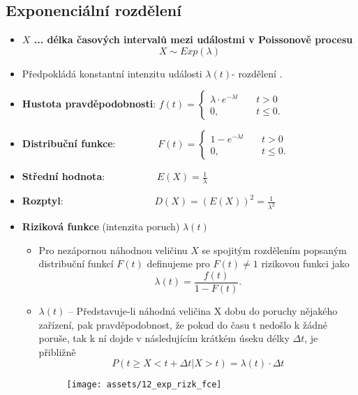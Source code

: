 \subsection{Exponenciální rozdělení}
\begin{itemize}
    \item \textbf{$X$ ... délka časových intervalů mezi událostmi v Poissonově procesu}
          $$X \sim Exp(\lambda)$$
    \item Předpokládá konstantní intenzitu události $\lambda(t)$- rozdělení .
    \item \textbf{Hustota pravděpodobnosti}:
          $f(t) =	\begin{cases}
                  \lambda \cdot e^{-\lambda t} & \quad t > 0     \\
                  0,                           & \quad t \leq 0.
              \end{cases}$
    \item \textbf{Distribuční funkce}:
          $\qquad\qquad F(t) =	\begin{cases}
                  1 -  e^{-\lambda t} & \quad t > 0     \\
                  0,                  & \quad t \leq 0.
              \end{cases}$
    \item \textbf{Střední hodnota}: $\qquad\qquad\quad E(X) = \frac{1}{\lambda}$
    \item \textbf{Rozptyl}: $\qquad\qquad\qquad\qquad\quad D(X) = (E(X))^2 = \frac{1}{\lambda^2}$ \\
    \item \textbf{Riziková funkce} (intenzita poruch) $\lambda (t)$
          \begin{itemize}
              \item Pro nezápornou náhodnou veličinu $X$ se spojitým rozdělením popsaným distribuční funkcí $F(t)$ definujeme pro $F(t) \not= 1$ rizikovou funkci jako  $$\lambda(t) = \frac{f(t)}{1 - F(t)}.$$
              \item $\lambda(t)$ -- Představuje-li náhodná veličina X dobu do poruchy nějakého zařízení, pak pravděpodobnost, že pokud do času t nedošlo k žádné poruše, tak k ní dojde v následujícím krátkém úseku délky $\Delta t$, je přibližně
                    $$P(t \geq X <t + \Delta t|X > t) = \lambda(t) \cdot \Delta t$$
                    \begin{figure}[H]
                        \centering
                        \texttt{[image: assets/12\_exp\_rizk\_fce]}

\end{figure}
\end{itemize}
\end{itemize}
